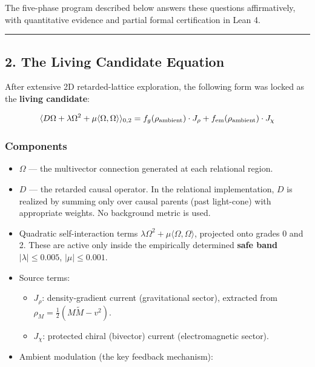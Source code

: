 \documentclass[
  11pt,
  a4paper,
]{article}
\providecommand{\tightlist}{%
  \setlength{\itemsep}{0pt}\setlength{\parskip}{0pt}}
\begin{document}
The five-phase program described below answers these questions
affirmatively, with quantitative evidence and partial formal
certification in Lean 4.

\begin{center}\rule{0.5\linewidth}{0.5pt}\end{center}

\subsection{2. The Living Candidate
Equation}\label{the-living-candidate-equation}

After extensive 2D retarded-lattice exploration, the following form was
locked as the \textbf{living candidate}:

\[
\langle D \Omega + \lambda \Omega^2 + \mu \langle \Omega, \Omega \rangle \rangle_{0,2}
= f_g(\rho_{\rm ambient}) \cdot J_\rho + f_{\rm em}(\rho_{\rm ambient}) \cdot J_\chi
\]

\subsubsection{Components}\label{components}

\begin{itemize}
\tightlist
\item
  \(\Omega\) --- the multivector connection generated at each relational
  region.
\item
  \(D\) --- the retarded causal operator. In the relational
  implementation, \(D\) is realized by summing only over causal parents
  (past light-cone) with appropriate weights. No background metric is
  used.
\item
  Quadratic self-interaction terms
  \(\lambda \Omega^2 + \mu \langle \Omega, \Omega \rangle\), projected
  onto grades 0 and 2. These are active only inside the empirically
  determined \textbf{safe band} \(|\lambda| \le 0.005\),
  \(|\mu| \le 0.001\).
\item
  Source terms:

  \begin{itemize}
  \tightlist
  \item
    \(J_\rho\): density-gradient current (gravitational sector),
    extracted from \(\rho_M = \frac12(M\tilde{M} - v^2)\).
  \item
    \(J_\chi\): protected chiral (bivector) current (electromagnetic
    sector).
  \end{itemize}
\item
  Ambient modulation (the key feedback mechanism):
\end{itemize}
\end{document}

